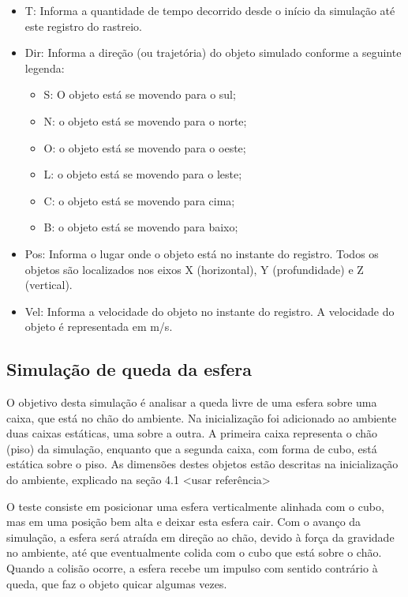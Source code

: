 \documentclass[12pt]{article}
\begin{document}
\begin{itemize}
\item T: Informa a quantidade de tempo decorrido desde o início da simulação até este registro do rastreio.
\item Dir: Informa a direção (ou trajetória) do objeto simulado conforme a seguinte legenda: 
\begin{itemize}
\item S: O objeto está se movendo para o sul;
\item N: o objeto está se movendo para o norte;
\item O: o objeto está se movendo para o oeste;
\item L: o objeto está se movendo para o leste;
\item C: o objeto está se movendo para cima;
\item B: o objeto está se movendo para baixo;
\end{itemize}

\item Pos: Informa o lugar onde o objeto está no instante do registro. Todos os objetos são localizados nos eixos X (horizontal), Y (profundidade) e Z (vertical).

\item Vel: Informa a velocidade do objeto no instante do registro. A velocidade do objeto é representada em m/s.
\end{itemize}

\subsection{Simulação de queda da esfera }

O objetivo desta simulação é analisar a queda livre de uma esfera sobre uma caixa, que está no chão do ambiente. Na inicialização foi adicionado ao ambiente duas caixas estáticas, uma sobre a outra. A primeira caixa representa o chão (piso) da simulação, enquanto que a segunda caixa, com forma de cubo, está estática sobre o piso. As dimensões destes objetos estão descritas na inicialização do ambiente, explicado na seção 4.1 <usar referência>

O teste consiste em posicionar uma esfera verticalmente alinhada com o cubo, mas em uma posição bem alta e deixar esta esfera cair. Com o avanço da simulação, a esfera será atraída em direção ao chão, devido à força da gravidade no ambiente, até que eventualmente colida com o cubo que está sobre o chão. Quando a colisão ocorre, a esfera recebe um impulso com sentido contrário à queda, que faz o objeto quicar algumas vezes. 
\end{document}
